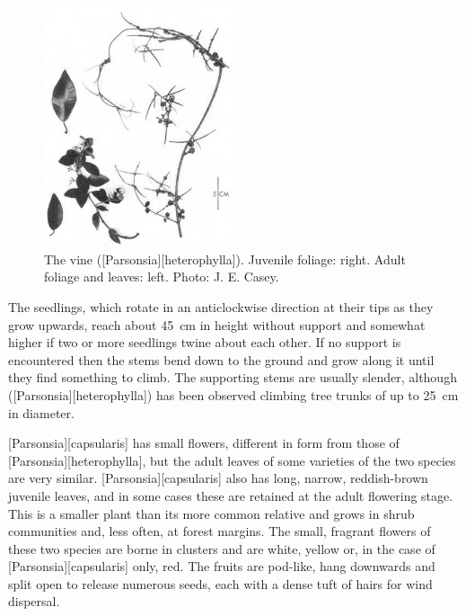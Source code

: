 \begin{figure}
	\includegraphics[width=0.5\textwidth]{graphics/figure34parsonsia.jpg}
	\centering
	\caption[The vine \emph{Parsonsia heterophylla}]{The vine  ([Parsonsia][heterophylla]). Juvenile foliage: right. Adult foliage and leaves: left. Photo: J. E. Casey.}%
	\label{fig:34parsonsia}
\end{figure}

The seedlings, which rotate in an anticlockwise direction at their tips as they grow upwards, reach about \SI{45}{\centi\metre} in height without support and somewhat higher if two or more seedlings twine about each other.
If no support is encountered then the stems bend down to the ground and grow along it until they find something to climb.
The supporting stems are usually slender, although  ([Parsonsia][heterophylla]) has been observed climbing tree trunks of up to \SI{25}{\centi\metre} in diameter.

[Parsonsia][capsularis] has small flowers, different in form from those of [Parsonsia][heterophylla], but the adult leaves of some varieties of the two species are very similar. [Parsonsia][capsularis] also has long, narrow, reddish-brown juvenile leaves, and in some cases these are retained at the adult flowering stage.
This is a smaller plant than its more common relative and grows in shrub communities and, less often, at forest margins.
The small, fragrant flowers of these two species are borne in clusters and are white, yellow or, in the case of [Parsonsia][capsularis] only, red.
The fruits are pod-like, hang downwards and split open to release numerous seeds, each with a dense tuft of hairs for wind dispersal.

